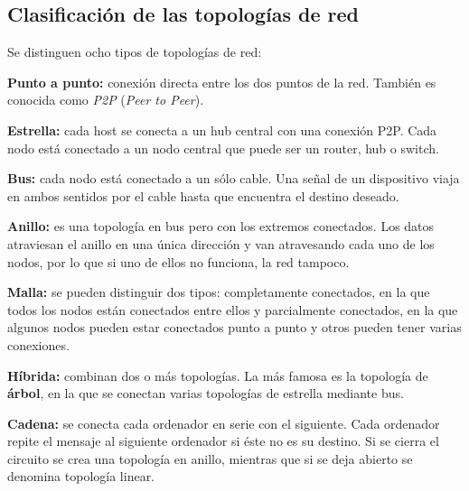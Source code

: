 \documentclass[a4paper, 11pt]{report} %
\begin{document}
\subsection{Clasificación de las topologías de red}
Se distinguen ocho tipos de topologías de red: \cite{bicsi-02}
\begin{description}
\item \textbf{Punto a punto:} conexión directa entre los dos puntos de la red. También es conocida como \textit{P2P} (\textit{Peer to Peer}).
\item \textbf{Estrella:} cada host se conecta a un hub central con una conexión P2P. Cada nodo está conectado a un nodo central que puede ser un router, hub o switch.
\item \textbf{Bus:} cada nodo está conectado a un sólo cable. Una señal de un dispositivo viaja en ambos sentidos por el cable hasta que encuentra el destino deseado.
\item \textbf{Anillo:} es una topología en bus pero con los extremos conectados. Los datos atraviesan el anillo en una única dirección y van atravesando cada uno de los nodos, por lo que si uno de ellos no funciona, la red tampoco.
\item \textbf{Malla:} se pueden distinguir dos tipos: completamente conectados, en la que todos los nodos están conectados entre ellos y parcialmente conectados, en la que algunos nodos pueden estar conectados punto a punto y otros pueden tener varias conexiones.
\item \textbf{Híbrida:} combinan dos o más topologías. La más famosa es la topología de \textbf{árbol}, en la que se conectan varias topologías de estrella mediante bus. 
\item \textbf{Cadena:} se conecta cada ordenador en serie con el siguiente. Cada ordenador repite el mensaje al siguiente ordenador si éste no es su destino. Si se cierra el circuito se crea una topología en anillo, mientras que si se deja abierto se denomina topología linear.
\end{description}
\end{document}
